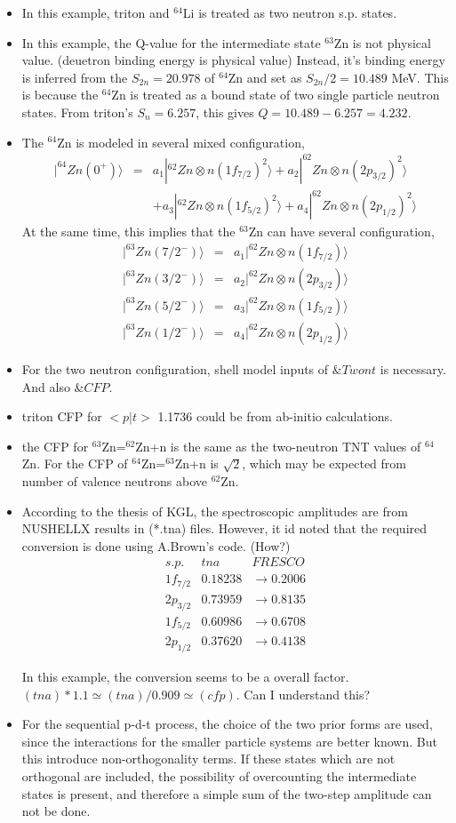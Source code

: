 \documentclass[11pt]{book}
\def\ra{\rangle}
\newcommand{\bea}{\begin{eqnarray}}
\newcommand{\eea}{\end{eqnarray}}
\newcommand{\no}{\nonumber \\}
\begin{document}
\begin{itemize}
\item In this example, triton and $^{64}$Li is treated as two neutron s.p. states. 
\item In this example, the Q-value for the intermediate state $^{63}$Zn is not physical value.
      (deuetron binding energy is physical value)  
      Instead, it's binding energy is inferred from the $S_{2n}=20.978$ of $^{64}$Zn 
      and set as $S_{2n}/2=10.489$ MeV. This is because the $^{64}$Zn is treated as a
      bound state of two single particle neutron states. 
      From triton's $S_n=6.257$, this gives $Q=10.489-6.257=4.232$. 
\item The $^{64}$Zn is modeled in several mixed configuration,
 \bea 
    |^{64}Zn(0^+)\ra &=& a_1 |^{62}Zn\otimes n(1f_{7/2})^2\ra 
                + a_2 |^{62}Zn\otimes n(2p_{3/2})^2\ra  \no & &
                + a_3 |^{62}Zn\otimes n(1f_{5/2})^2\ra 
                + a_4 |^{62}Zn\otimes n(2p_{1/2})^2\ra 
 \eea        
      At the same time, this implies that the $^{63}$Zn can have several configuration,
 \bea 
     |^{63}Zn(7/2^-)\ra &=& a_1 |^{62}Zn\otimes n(1f_{7/2})\ra \no 
     |^{63}Zn(3/2^-)\ra&=& a_2 |^{62}Zn\otimes n(2p_{3/2})\ra  \no 
     |^{63}Zn(5/2^-)\ra&=& a_3 |^{62}Zn\otimes n(1f_{5/2})\ra  \no 
     |^{63}Zn(1/2^-)\ra&=& a_4 |^{62}Zn\otimes n(2p_{1/2})\ra 
  \eea     
\item For the two neutron configuration, shell model inputs of $\&Twont$ is necessary. 
     And also $\&CFP$.   
\item triton CFP for $<p|t>$ 1.1736 could be from ab-initio calculations.
\item the CFP for $^{63}$Zn=$^{62}$Zn+n is the same as the two-neutron TNT values
     of $^{64}$Zn. For the CFP of $^{64}$Zn=$^{63}$Zn+n is $\sqrt{2}$, which may be
     expected from number of valence neutrons above $^{62}$Zn. 
\item According to the thesis of KGL, the spectroscopic amplitudes are from NUSHELLX results 
     in (*.tna) files. However, it id noted that the required conversion is done using 
     A.Brown's code. (How?)
     \bea 
      s.p.  & tna & FRESCO  \no 
      1f_{7/2} & 0.18238 &\to 0.2006 \no 
      2p_{3/2} & 0.73959 &\to 0.8135 \no  
      1f_{5/2} & 0.60986 &\to 0.6708 \no 
      2p_{1/2} & 0.37620 &\to 0.4138 \nonumber 
     \eea 
     
     In this example, the conversion seems to be a overall factor. 
     $(tna) *1.1\simeq (tna)/0.909\simeq (cfp)$. Can I understand this?
     
      
\item For the sequential
p-d-t process, the choice of the two prior forms are used, since the interactions for the
smaller particle systems are better known. But this introduce non-orthogonality terms.
If these states which are not orthogonal
are included, the possibility of overcounting the intermediate states is present, and
therefore a simple sum of the two-step amplitude can not be done.     
\end{itemize}
\end{document}
